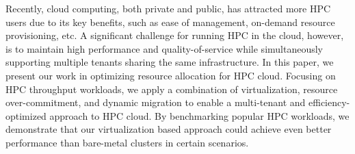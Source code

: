 Recently, cloud computing, both private and public, has attracted more HPC users due to its key benefits, such as ease of management, on-demand resource provisioning, etc. A significant challenge for running HPC in the cloud, however, is to maintain high performance and quality-of-service while simultaneously supporting multiple tenants sharing the same infrastructure. 
In this paper, we present our work in optimizing resource allocation for HPC cloud. %
Focusing on HPC throughput workloads, we apply a combination of virtualization, resource over-commitment, 
and dynamic migration to enable a multi-tenant and efficiency-optimized approach to HPC cloud. 
By benchmarking popular HPC workloads, we demonstrate that our virtualization based approach could achieve even better performance than bare-metal clusters in certain scenarios. 
